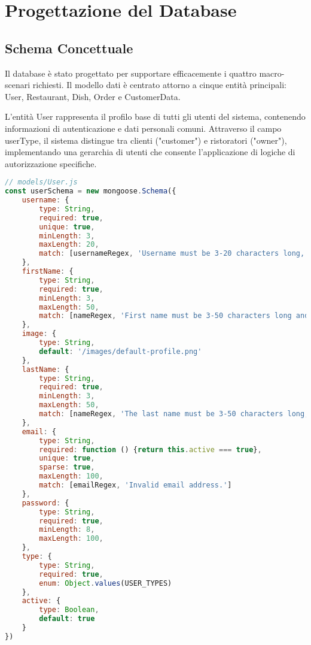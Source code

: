 \documentclass[12pt,a4paper]{article}
\begin{document}
\section{Progettazione del Database}

\subsection{Schema Concettuale}

Il database è stato progettato per supportare efficacemente i quattro macro-scenari richiesti. Il modello dati è centrato attorno a cinque entità principali: User, Restaurant, Dish, Order e CustomerData.

L'entità User rappresenta il profilo base di tutti gli utenti del sistema, contenendo informazioni di autenticazione e dati personali comuni. Attraverso il campo userType, il sistema distingue tra clienti ("customer") e ristoratori ("owner"), implementando una gerarchia di utenti che consente l'applicazione di logiche di autorizzazione specifiche.

\begin{lstlisting}[language=JavaScript, caption=Schema del modello User]
// models/User.js
const userSchema = new mongoose.Schema({
    username: {
        type: String,
        required: true,
        unique: true,
        minLength: 3,
        maxLength: 20,
        match: [usernameRegex, 'Username must be 3-20 characters long, must contain only letters, numbers and underscores.']
    },
    firstName: {
        type: String,
        required: true,
        minLength: 3,
        maxLength: 50,
        match: [nameRegex, 'First name must be 3-50 characters long and contain only letters, spaces, apostrophes, or hyphens.']
    },
    image: {
        type: String,
        default: '/images/default-profile.png'
    },
    lastName: {
        type: String,
        required: true,
        minLength: 3,
        maxLength: 50,
        match: [nameRegex, 'The last name must be 3-50 characters long, must contain only letters, apostrophes, dots, dashes and spaces..']
    },
    email: {
        type: String,
        required: function () {return this.active === true},
        unique: true,
        sparse: true,
        maxLength: 100,
        match: [emailRegex, 'Invalid email address.']
    },
    password: {
        type: String,
        required: true,
        minLength: 8,
        maxLength: 100,
    },
    type: {
        type: String,
        required: true,
        enum: Object.values(USER_TYPES)
    },
    active: {
        type: Boolean,
        default: true
    }
})
\end{lstlisting}
\end{document}
